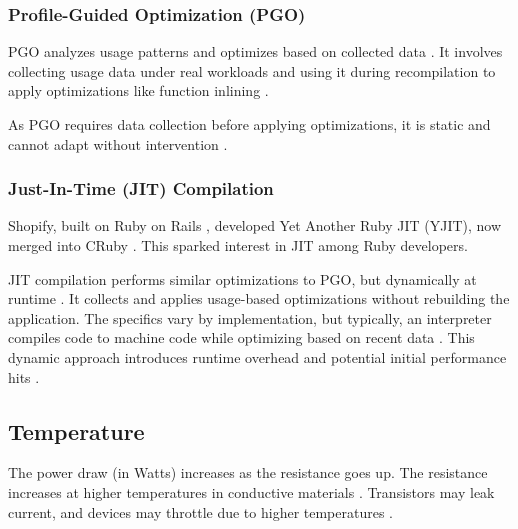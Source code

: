 \documentclass[main.tex]{subfiles}
\begin{document}
\subsubsection{Profile-Guided Optimization (PGO)}

PGO analyzes usage patterns and optimizes based on collected data \cite{Wicht_Vitillo_Chen_Levinthal_2014}. It involves collecting usage data under real workloads and using it during recompilation to apply optimizations like function inlining \cite{Wade_Kulkarni_Jantz_2017}. 

As PGO requires data collection before applying optimizations, it is static and cannot adapt without intervention \cite{Wade_Kulkarni_Jantz_2017}.

\subsubsection{Just-In-Time (JIT) Compilation}

Shopify, built on Ruby on Rails \cite{shopify-yjit}, developed Yet Another Ruby JIT (YJIT), now merged into CRuby \cite{shopify-yjit}. This sparked interest in JIT among Ruby developers.

JIT compilation performs similar optimizations to PGO, but dynamically at runtime \cite{Wade_Kulkarni_Jantz_2017}. It collects and applies usage-based optimizations without rebuilding the application. The specifics vary by implementation, but typically, an interpreter compiles code to machine code while optimizing based on recent data \cite{Wade_Kulkarni_Jantz_2017}. This dynamic approach introduces runtime overhead and potential initial performance hits \cite{Aycock_2003}.

\subsection{Temperature}
The power draw (in Watts) increases as the resistance goes up. The resistance increases at higher temperatures in conductive materials \cite{ling2016university}. Transistors may leak current, and devices may throttle due to higher temperatures \cite{benoit2020impact}.  
\end{document}
